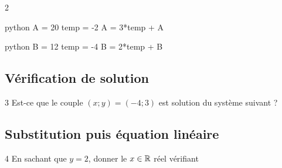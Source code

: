 \begin{frame}[fragile]{2\vspace{-32pt}}	
\vspace{-5pt}
\begin{center}
\begin{minipage}{0.4\textwidth}
\begin{mintedbox}{python}
A = 20
temp = -2
A = 3*temp + A
\end{mintedbox}
\end{minipage}
\hspace{20pt}
\begin{minipage}{0.4\textwidth}
\begin{mintedbox}{python}
B = 12
temp = -4
B = 2*temp + B
\end{mintedbox}
\end{minipage}
\end{center}

\end{frame}


\subsection{Vérification de solution}

\begin{frame}{3\vspace{-32pt}}
	\vfill 
	Est-ce que le couple $(x;y) = (-4;3)$ est solution du système suivant ?
\end{frame}


\subsection{Substitution puis équation linéaire}

\begin{frame}{4\vspace{-32pt}}	
	En sachant que $y=2$, donner le $x\in\mathbb{R}$ réel vérifiant

\end{frame}

